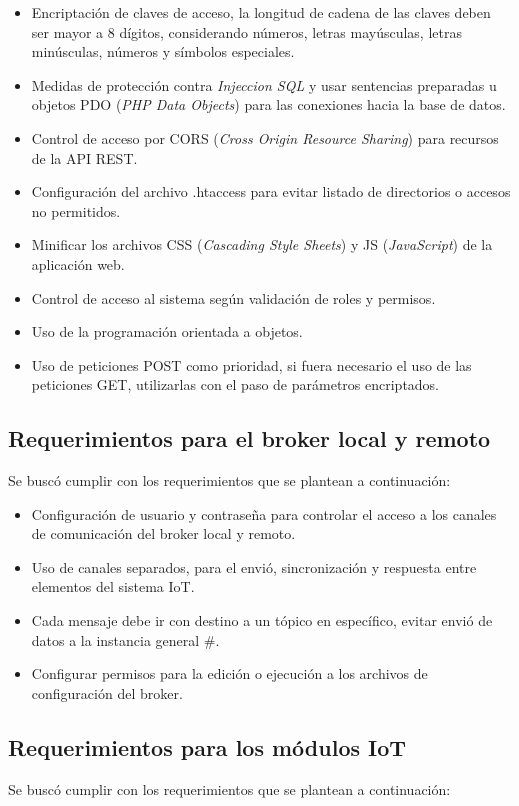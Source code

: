 \begin{itemize}
\item Encriptación de claves de acceso, la longitud de cadena de las claves  deben ser mayor a 8 dígitos, considerando números, letras mayúsculas, letras minúsculas, números y símbolos especiales.
\item Medidas de protección contra \emph{Injeccion SQL} y usar sentencias preparadas u objetos PDO (\emph{PHP Data Objects}) para las conexiones hacia la base de datos.
\item Control de acceso por CORS (\emph{Cross Origin Resource Sharing}) para recursos de la API REST.
\item Configuración del archivo .htaccess para evitar listado de directorios o accesos no permitidos.
\item Minificar los archivos CSS (\emph{Cascading Style Sheets}) y JS (\emph{JavaScript}) de la aplicación web.
\item Control de acceso al sistema según validación de roles y permisos.
\item Uso de la programación orientada a objetos.
\item Uso de peticiones POST como prioridad, si fuera necesario el uso de las peticiones GET, utilizarlas con el paso de parámetros encriptados.
\end{itemize}

\subsection{Requerimientos para el broker local y remoto}
Se buscó cumplir con los requerimientos que se plantean a continuación:

\begin{itemize}
\item Configuración de usuario y contraseña para controlar el acceso a los canales de comunicación del broker local y remoto.
\item Uso de canales separados, para el envió, sincronización y respuesta entre elementos del sistema IoT.
\item Cada mensaje debe ir con destino a un tópico en específico, evitar envió de datos a la instancia general \#.
\item Configurar permisos para la edición o ejecución a los archivos de configuración del broker.
\end{itemize}

\subsection{Requerimientos para los módulos IoT}
Se buscó cumplir con los requerimientos que se plantean a continuación:

